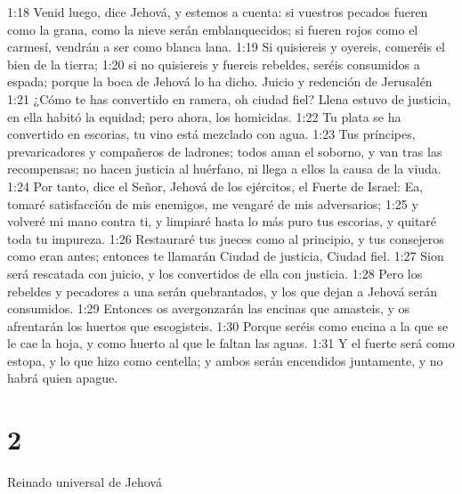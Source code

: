 1:18 Venid luego, dice Jehová, y estemos a cuenta: si vuestros pecados fueren como la grana, como la nieve serán emblanquecidos; si fueren rojos como el carmesí, vendrán a ser como blanca lana.  
1:19 Si quisiereis y oyereis, comeréis el bien de la tierra;  
1:20 si no quisiereis y fuereis rebeldes, seréis consumidos a espada; porque la boca de Jehová lo ha dicho.  
Juicio y redención de Jerusalén  
1:21 ¿Cómo te has convertido en ramera, oh ciudad fiel? Llena estuvo de justicia, en ella habitó la equidad; pero ahora, los homicidas.  
1:22 Tu plata se ha convertido en escorias, tu vino está mezclado con agua.  
1:23 Tus príncipes, prevaricadores y compañeros de ladrones; todos aman el soborno, y van tras las recompensas; no hacen justicia al huérfano, ni llega a ellos la causa de la viuda.  
1:24 Por tanto, dice el Señor, Jehová de los ejércitos, el Fuerte de Israel: Ea, tomaré satisfacción de mis enemigos, me vengaré de mis adversarios;  
1:25 y volveré mi mano contra ti, y limpiaré hasta lo más puro tus escorias, y quitaré toda tu impureza.  
1:26 Restauraré tus jueces como al principio, y tus consejeros como eran antes; entonces te llamarán Ciudad de justicia, Ciudad fiel.  
1:27 Sion será rescatada con juicio, y los convertidos de ella con justicia.  
1:28 Pero los rebeldes y pecadores a una serán quebrantados, y los que dejan a Jehová serán consumidos.  
1:29 Entonces os avergonzarán las encinas que amasteis, y os afrentarán los huertos que escogisteis.  
1:30 Porque seréis como encina a la que se le cae la hoja, y como huerto al que le faltan las aguas.  
1:31 Y el fuerte será como estopa, y lo que hizo como centella; y ambos serán encendidos juntamente, y no habrá quien apague.  

\chapter{2}

Reinado universal de Jehová  
 
